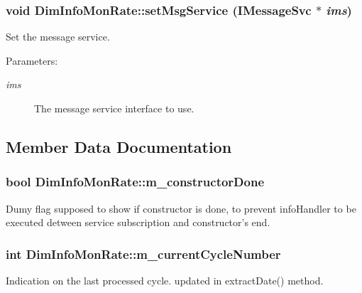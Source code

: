 \subsubsection{\setlength{\rightskip}{0pt plus 5cm}void Dim\-Info\-Mon\-Rate::set\-Msg\-Service (IMessage\-Svc $\ast$ {\em ims})\hspace{0.3cm}{\tt  [inline]}}\label{classDimInfoMonRate_a7}


Set the message service.

\begin{Desc}
\item[Parameters:]
\begin{description}
\item[{\em ims}]The message service interface to use.\end{description}
\end{Desc}


\subsection{Member Data Documentation}
\subsubsection{\setlength{\rightskip}{0pt plus 5cm}bool {\bf Dim\-Info\-Mon\-Rate::m\_\-constructor\-Done}\hspace{0.3cm}{\tt  [private]}}\label{classDimInfoMonRate_r0}


Dumy flag supposed to show if constructor is done, to prevent info\-Handler to be executed detween service subscription and constructor's end.
\subsubsection{\setlength{\rightskip}{0pt plus 5cm}int {\bf Dim\-Info\-Mon\-Rate::m\_\-current\-Cycle\-Number}\hspace{0.3cm}{\tt  [private]}}\label{classDimInfoMonRate_r6}


Indication on the last processed cycle. updated in extract\-Date() method.
